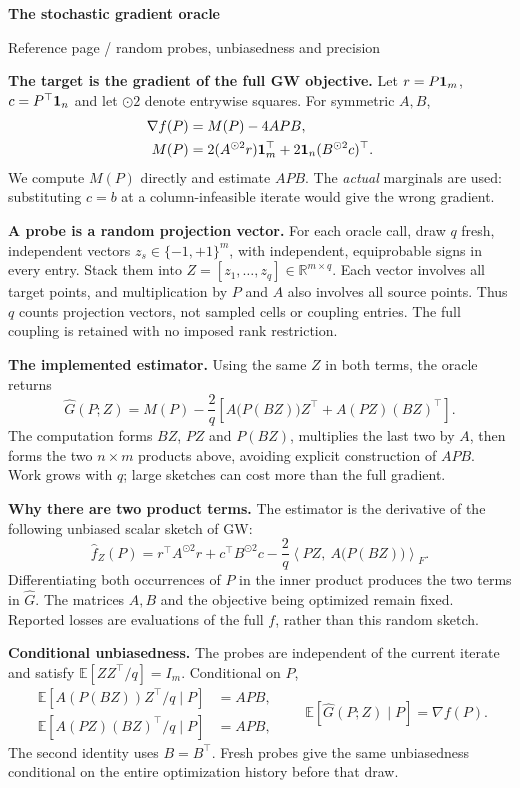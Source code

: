 {\color{ink}\fontsize{19}{22}\selectfont\bfseries The stochastic gradient oracle\par}
{\small\color{muted}Reference page \enspace / \enspace random probes, unbiasedness and precision\par}
\vspace{7pt}

\textbf{The target is the gradient of the full GW objective.}
Let $r=P\mathbf{1}_m$, $c=P^\top\mathbf{1}_n$ and let $\odot2$ denote entrywise squares.
For symmetric $A,B$,
\[
 \begin{aligned}
 \nabla f(P)&=M(P)-4APB,\\
 M(P)&=2(A^{\odot2}r)\mathbf{1}_m^\top+2\mathbf{1}_n(B^{\odot2}c)^\top.
 \end{aligned}
\]
We compute $M(P)$ directly and estimate $APB$. The \emph{actual} marginals are
used: substituting $c=b$ at a column-infeasible iterate would give the wrong gradient.

\textbf{A probe is a random projection vector.}
For each oracle call, draw $q$ fresh, independent vectors
$z_s\in\{-1,+1\}^m$, with independent, equiprobable signs in every entry.
Stack them into $Z=[z_1,\ldots,z_q]\in\mathbb R^{m\times q}$.
Each vector involves all target points, and multiplication by $P$ and $A$ also
involves all source points. Thus $q$ counts projection vectors, not sampled cells
or coupling entries. The full coupling is retained with no imposed rank restriction.

\textbf{The implemented estimator.}
Using the same $Z$ in both terms, the oracle returns
\[
 \boxed{\widehat G(P;Z)=M(P)-\frac{2}{q}
 \left[A\bigl(P(BZ)\bigr)Z^\top+A(PZ)(BZ)^\top\right].}
\]
The computation forms $BZ$, $PZ$ and $P(BZ)$, multiplies the last two by $A$,
then forms the two $n\times m$ products above, avoiding explicit construction of
$APB$. Work grows with $q$; large sketches can cost more than the full gradient.

\textbf{Why there are two product terms.}
The estimator is the derivative of the following unbiased scalar sketch of GW:
\[
 \widehat f_Z(P)=r^\top A^{\odot2}r+c^\top B^{\odot2}c
 -\frac{2}{q}\left\langle PZ,\ A\bigl(P(BZ)\bigr)\right\rangle_F.
\]
Differentiating both occurrences of $P$ in the inner product produces the two
terms in $\widehat G$. The matrices $A,B$ and the objective being optimized remain
fixed. Reported losses are evaluations of the full $f$, rather than this random sketch.

\textbf{Conditional unbiasedness.}
The probes are independent of the current iterate and satisfy
$\mathbb E[ZZ^\top/q]=I_m$. Conditional on $P$,
\[
 \begin{aligned}
 \mathbb E\!\left[A(P(BZ))Z^\top/q\mid P\right]&=APB,\\
 \mathbb E\!\left[A(PZ)(BZ)^\top/q\mid P\right]&=APB,
 \end{aligned}
 \qquad
 \mathbb E[\widehat G(P;Z)\mid P]=\nabla f(P).
\]
The second identity uses $B=B^\top$. Fresh probes give the same unbiasedness
conditional on the entire optimization history before that draw.

